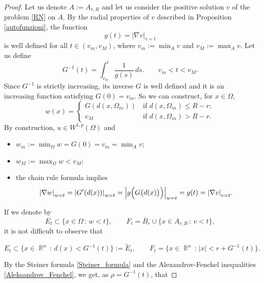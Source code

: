 \documentclass[oneside,a4paper,11pt,notitlepage]{article}
\newcommand{\abs}[1]{{\left|#1\right|}}
\theoremstyle{plain}
\numberwithin{teor}{section}
\numberwithin{equation}{section}
\theoremstyle{definition}
\theoremstyle{plain}
\theoremstyle{plain}
\theoremstyle{plain}
\theoremstyle{plain}
\theoremstyle{definition}
\theoremstyle{definition}
\theoremstyle{plain}
\DeclareMathOperator{\R}{\mathbb{R}}
\begin{document}
\begin{proof}
Let us denote $A:=A_{r,R}$ and let us consider the positive solution $v$ of the problem \eqref{RN} on $A$.
By the radial properties of $v$ described in Proposition \ref{autofunzioni}, the function
    \[
    g(t)= \abs{\nabla v}_{v=t}
    \]
    is well defined for all $t\in (v_m, v_M)$, where $\displaystyle{v_m:=\min_{A} v}$ and $\displaystyle{v_M:= \max_{A} v}$.
    Let us define 
    \begin{equation*}
        \label{fug}
        G^{-1}(t)=\int_{v_m}^{t} \frac{1}{g(s)}\, ds. \qquad v_m < t <v_M.
    \end{equation*}
    Since $G^{-1}$ is strictly increasing, its inverse $G$ is well defined and it is an increasing function satisfying $G(0)=v_m$. So we can construct, for $x \in \Omega$,\begin{equation}
        \label{w=gd}
        w(x) =\begin{cases}
             G( d(x, \Omega_{in})) \, & \text{if }  d(x, \Omega_{in}) \leq R-r;\\
             v_M & \text{if } d(x, \Omega_{in}) > R-r.
        \end{cases}
    \end{equation}
    By construction, $u\in W^{1,p}(\Omega)$ and

    
    \begin{itemize} 
        \item $w_m:=\displaystyle \min_{\Omega} w= G(0)=v_m=\min_{A} v$;

        \item $w_M:=\displaystyle \max_{\Omega} w<v_M;$ 
        
        \item the chain rule formula implies 
        \[
        \abs{\nabla w}_{w=t}= \abs{G'(d(x))}_{w=t} = \Bigl \lvert g \Bigl( G \bigl (d(x ) \bigr) \Bigr) \Bigr \rvert_{w=t} = g(t)= \abs{\nabla v}_{v=t}.
        \]
        
    \end{itemize}


If we denote by $$E_t \subset \{x \in \Omega\, : \, w <t\}, \qquad F_t=\overline B_{r} \cup \{x \in A_{r,R}\, : \, v <t\},$$
it is not difficult to observe that

$$E_t\subset  \{x \in \R^{n}\, : \, d(x) <G^{-1}(t)\}:= \tilde E_t, \qquad F_t=\{x \in \R^n\, : \, \abs{x} <r+G^{-1}(t)\}.$$

By the Steiner formula  \eqref{Steiner_formula} and the Alexandrov-Fenchel inequalities \eqref{Aleksandrov_Fenchel}, we get, as $\rho = G^{-1}(t)$, that


\end{proof}
\end{document}
